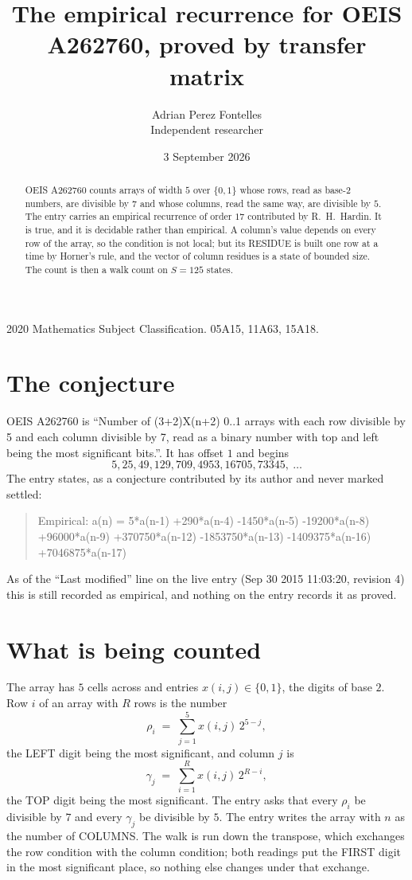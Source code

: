 \documentclass[11pt,a4paper]{article}
\title{The empirical recurrence for OEIS A262760, proved by transfer matrix}
\author{Adrian Perez Fontelles\\ \small Independent researcher}
\date{3 September 2026}
\theoremstyle{plain}
\theoremstyle{definition}
\begin{document}
\maketitle

\begin{abstract}
OEIS A262760 counts arrays of width $5$ over $\{0,1\}$ whose rows, read as base-$2$
numbers, are divisible by $7$ and whose columns, read the same way, are divisible by
$5$. The entry carries an empirical recurrence of order $17$ contributed by
R.~H.~Hardin. It is true, and it is decidable rather than empirical. A column's value depends on
every row of the array, so the condition is not local; but its RESIDUE is built one row at a
time by Horner's rule, and the vector of column residues is a state of bounded size. The count
is then a walk count on $S=125$ states.
\end{abstract}

\noindent\small 2020 Mathematics Subject Classification. 05A15, 11A63, 15A18.\normalsize

\section{The conjecture}

OEIS A262760 is ``Number of (3+2)X(n+2) 0..1 arrays with each row divisible by 5 and each column divisible by 7, read as a binary number with top and left being the most significant bits.''. It has offset $1$ and begins
\[
5, 25, 49, 129, 709, 4953, 16705, 73345,\ \dots
\]
The entry states, as a conjecture contributed by its author and never marked settled:
\begin{quote}
Empirical: a(n) = 5*a(n-1) +290*a(n-4) -1450*a(n-5) -19200*a(n-8) +96000*a(n-9) +370750*a(n-12) -1853750*a(n-13) -1409375*a(n-16) +7046875*a(n-17)
\end{quote}
As of the ``Last modified'' line on the live entry (Sep 30 2015 11:03:20, revision 4) this is still
recorded as empirical, and nothing on the entry records it as proved.

\section{What is being counted}

The array has $5$ cells across and entries $x(i,j)\in\{0,1\}$, the digits of
base $2$. Row $i$ of an array with $R$ rows is the number
\[
\rho_i\;=\;\sum_{j=1}^{5}x(i,j)\,2^{5-j} ,
\]
the LEFT digit being the most significant, and column $j$ is
\[
\gamma_j\;=\;\sum_{i=1}^{R}x(i,j)\,2^{R-i} ,
\]
the TOP digit being the most significant. The entry asks that every $\rho_i$ be divisible by
$7$ and every $\gamma_j$ be divisible by $5$. The entry writes the array with $n$ as the number of COLUMNS. The walk is run down the transpose, which exchanges the row condition with the column condition; both readings put the FIRST digit in the most significant place, so nothing else changes under that exchange.
\end{document}
